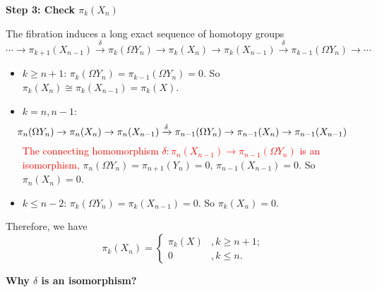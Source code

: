     \textbf{Step 3: Check $\pi_k(X_n)$}
    
    The fibration induces a long exact sequence of homotopy groups
    \begin{equation*}
        \cdots \to \pi_{k+1}(X_{n-1}) \xrightarrow{\delta} \pi_k(\Omega Y_n) 
        \to \pi_k(X_n) \to \pi_k(X_{n-1}) \xrightarrow{\delta} \pi_{k-1}(\Omega Y_n) \to \cdots
    \end{equation*}
    \begin{itemize}
        \item $k\geq n+1$: $\pi_{k}(\Omega Y_n) = \pi_{k-1}(\Omega Y_n) = 0$. 
        So $\pi_k(X_n) \cong \pi_k(X_{n-1}) = \pi_k(X)$.
        \item $k=n,n-1$: 
        \begin{equation*}
        \hspace*{-2em}
        \pi_{n}(\Omega Y_n) \to \pi_{n}(X_n) \to \pi_{n}(X_{n-1}) 
        \xrightarrow{\delta} \pi_{n-1}(\Omega Y_n) \to \pi_{n-1}(X_n) 
        \to \pi_{n-1}(X_{n-1})
        \end{equation*}
        \textcolor{red}{
        The connecting homomorphism 
        $\delta: \pi_{n}(X_{n-1}) \to \pi_{n-1}(\Omega Y_n)$ 
        is an isomorphism,} 
        $\pi_n(\Omega Y_n) = \pi_{n+1}(Y_n) = 0$,
        $\pi_{n-1}(X_{n-1}) = 0$. So $\pi_n(X_n) = 0$. 
        \item $k\leq n-2$: $\pi_k(\Omega Y_n) = \pi_k(X_{n-1}) = 0$. 
        So $\pi_k(X_n) = 0$. 

    \end{itemize}
    Therefore, we have 
    \begin{equation*}
        \pi_k(X_n) = 
        \begin{cases}
            \pi_k(X) &, k\geq n+1; \\
            0 &, k\leq n. 
        \end{cases}
    \end{equation*} 
    
    \textbf{Why $\delta$ is an isomorphism?}

